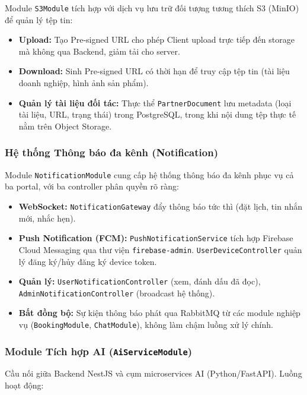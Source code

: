 Module \texttt{S3Module} tích hợp với dịch vụ lưu trữ đối tượng tương thích S3 (MinIO) để quản lý tệp tin:

\begin{itemize}
    \item \textbf{Upload:} Tạo Pre-signed URL cho phép Client upload trực tiếp đến storage mà không qua Backend, giảm tải cho server.
    \item \textbf{Download:} Sinh Pre-signed URL có thời hạn để truy cập tệp tin (tài liệu doanh nghiệp, hình ảnh sản phẩm).
    \item \textbf{Quản lý tài liệu đối tác:} Thực thể \texttt{PartnerDocument} lưu metadata (loại tài liệu, URL, trạng thái) trong PostgreSQL, trong khi nội dung tệp thực tế nằm trên Object Storage.
\end{itemize}

\subsubsection{Hệ thống Thông báo đa kênh (Notification)}

Module \texttt{NotificationModule} cung cấp hệ thống thông báo đa kênh phục vụ cả ba portal, với ba controller phân quyền rõ ràng:

\begin{itemize}
    \item \textbf{WebSocket:} \texttt{NotificationGateway} đẩy thông báo tức thì (đặt lịch, tin nhắn mới, nhắc hẹn).
    \item \textbf{Push Notification (FCM):} \texttt{PushNotificationService} tích hợp Firebase Cloud Messaging qua thư viện \texttt{firebase-admin}. \texttt{UserDeviceController} quản lý đăng ký/hủy đăng ký device token.
    \item \textbf{Quản lý:} \texttt{UserNotificationController} (xem, đánh dấu đã đọc), \texttt{AdminNotificationController} (broadcast hệ thống).
    \item \textbf{Bất đồng bộ:} Sự kiện thông báo phát qua RabbitMQ từ các module nghiệp vụ (\texttt{BookingModule}, \texttt{ChatModule}), không làm chậm luồng xử lý chính.
\end{itemize}

\subsubsection{Module Tích hợp AI (\texttt{AiServiceModule})}

Cầu nối giữa Backend NestJS và cụm microservices AI (Python/FastAPI). Luồng hoạt động:

